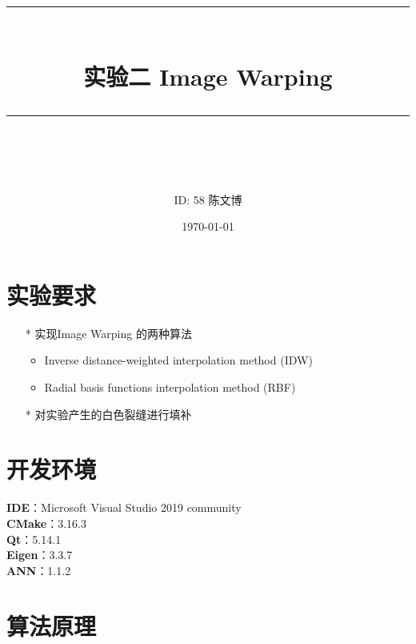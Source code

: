 \documentclass[14pt]{scrartcl} %
\title{	
	\normalfont\normalsize
	\rule{\linewidth}{0.5pt}\\ %
	\vspace{20pt} %
	{\huge 实验二	Image Warping}\\ %
	\vspace{12pt} %
	\rule{\linewidth}{2pt}\\ %
	\vspace{12pt} %
}
\author{\LARGE ID: 58		陈文博} %
\date{\normalsize\today} %
\begin{document}
	
	\maketitle %
	
	
	\section{实验要求}
	
	
	\begin{itemize}
		\item[*] 实现Image Warping 的两种算法
		\begin{itemize}
			\item Inverse distance-weighted interpolation method (IDW)
			\item Radial basis functions interpolation method (RBF)
		\end{itemize}
		\item[*] 对实验产生的白色裂缝进行填补
	\end{itemize}
	
	
	\section{开发环境}
	
	\textbf{IDE}：Microsoft Visual Studio 2019 community\\
	\textbf{CMake}：3.16.3\\
	\textbf{Qt}：5.14.1\\
	\textbf{Eigen}：3.3.7\\
	\textbf{ANN}：1.1.2
	
	
	\pagebreak
	\section{算法原理}
	
\end{document}
